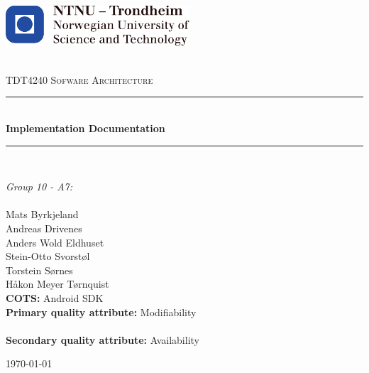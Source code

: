 \begin{titlepage}
\centering

\begin{center}
    \includegraphics[height=1.5cm]{figs/ntnu_logo.pdf}\\[1cm]
\end{center}

\begin{center}

\newcommand{\myauthor}{Mats Byrkjeland\\Andreas Drivenes\\Anders Wold Eldhuset\\Stein-Otto Svorstøl\\Torstein Sørnes\\Håkon Meyer Tørnquist} 
\newcommand{\mytitle}{Implementation Documentation}
\newcommand{\mygroupnumber}{10 - A7}

~\\[1.5cm]

\textsc{\Large TDT4240 Sofware Architecture}\\[0.5cm]

\hrule ~\\[0.2cm]
{\huge \bfseries \mytitle}\\[0.4cm]		%
\hrule ~\\[1.5cm]

\begin{minipage}{0.4\textwidth}
    \centering
	\large
		\emph{Group \mygroupnumber:}\\~\\
		\myauthor\\
		\vspace{2.5cm}
		\textbf{COTS:} Android SDK\\ 
		\vspace{1.5cm}
		\textbf{Primary quality attribute:} Modifiability\\~\\
		\textbf{Secondary quality attribute:} Availability
\end{minipage}

\vfill

{\large \today}

\end{center}
\end{titlepage}


\thispagestyle{empty}